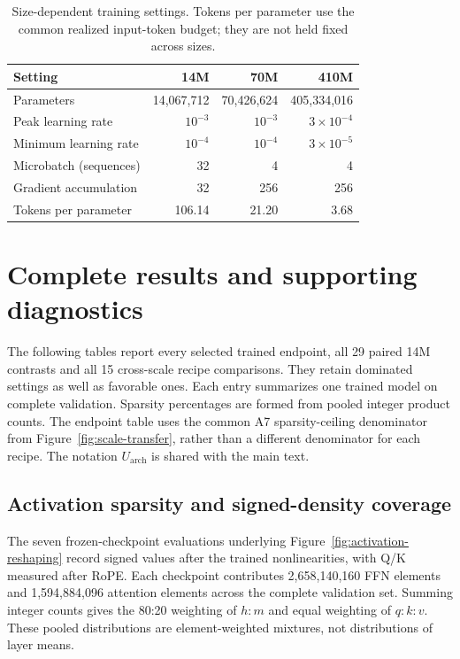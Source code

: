 \begin{table}[htbp]
\centering\small
\caption{Size-dependent training settings. Tokens per parameter use the
common realized input-token budget; they are not held fixed across sizes.}
\label{tab:training-settings}
\begin{tabular}{@{}lrrr@{}}
\toprule
Setting & 14M & 70M & 410M \\
\midrule
Parameters & 14,067,712 & 70,426,624 & 405,334,016 \\
Peak learning rate & $10^{-3}$ & $10^{-3}$ & $3\!\times\!10^{-4}$ \\
Minimum learning rate & $10^{-4}$ & $10^{-4}$ & $3\!\times\!10^{-5}$ \\
Microbatch (sequences) & 32 & 4 & 4 \\
Gradient accumulation & 32 & 256 & 256 \\
Tokens per parameter & 106.14 & 21.20 & 3.68 \\
\bottomrule
\end{tabular}
\end{table}

\FloatBarrier
\section{Complete results and supporting diagnostics}
\label{app:complete-results}

The following tables report every selected trained endpoint, all 29 paired
14M contrasts and all 15 cross-scale recipe comparisons. They retain
dominated settings as well as favorable ones. Each entry summarizes one
trained model on complete validation. Sparsity percentages are formed from pooled integer
product counts. The endpoint table uses the common A7 sparsity-ceiling denominator
from Figure~\ref{fig:scale-transfer}, rather than a different denominator
for each recipe. The notation $U_{\mathrm{arch}}$ is shared with the main text.





\subsection{Activation sparsity and signed-density coverage}
\label{app:density-results}

The seven frozen-checkpoint evaluations underlying
Figure~\ref{fig:activation-reshaping} record signed values after the trained
nonlinearities, with Q/K measured after RoPE. Each checkpoint contributes
2,658,140,160 FFN elements and 1,594,884,096 attention elements across the
complete validation set. Summing integer counts gives the 80:20 weighting
of $h:m$ and equal weighting of $q:k:v$. These pooled distributions are
element-weighted mixtures, not distributions of layer means.

